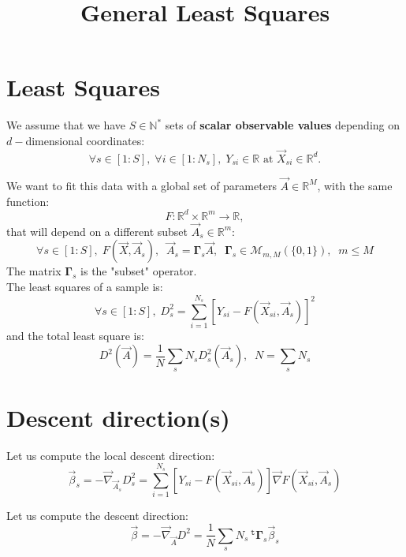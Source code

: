 \documentclass[aps,12pt]{revtex4}
\newcommand{\trn}[1]{~^{\mathtt{t}}{#1}}
\begin{document}
\title{General Least Squares}
\maketitle

\section{Least Squares}
We assume that we have $S\in \mathbb{N}^*$ sets of \textbf{scalar observable values} depending on $d-$dimensional coordinates:
\begin{equation}
	\forall s \in [1:S], \; \forall i \in [1:N_s], \; Y_{si} \in \mathbb{R} \text{ at } \vec{X}_{si} \in \mathbb{R}^d.
\end{equation}

We want to fit this data with a global set of parameters $\vec{A}\in \mathbb{R}^M$,
with the same function: 
\begin{equation}
F : \mathbb{R}^d \times \mathbb{R}^m \rightarrow \mathbb{R},
\end{equation}
that will depend on a different subset $\vec{A}_s\in\mathbb{R}^m$:
\begin{equation}
	\forall s \in [1:S], \; F(\vec{X},\vec{A}_s), \;\; \vec{A}_s = \bm{\Gamma}_s \vec{A}, \;\; \bm{\Gamma}_s \in \mathcal{M}_{m,M}(\{0,1\}),\;\;m\leq M
\end{equation}
The matrix $\bm{\Gamma}_s$ is the "subset" operator.\\
The least squares of a sample is:
\begin{equation}
		\forall s \in [1:S], \; D^2_s = \sum_{i=1}^{N_s} \left[ Y_{si} - F(\vec{X}_{si},\vec{A}_s) \right]^2
\end{equation}
and the total least square is:
\begin{equation}
	D^2(\vec{A}) = \frac{1}{N}\sum_s N_s D^2_s (\vec{A}_s ),\;\; N=\sum_s N_s
\end{equation}

\section{Descent direction(s)}
Let us compute the local descent direction:
\begin{equation}
	\vec{\beta}_s = - \vec{\nabla}_{\vec{A}_s} D^2_s =  \sum_{i=1}^{N_s} \left[ Y_{si} - F(\vec{X}_{si},\vec{A}_s) \right] \vec{\nabla} F(\vec{X}_{si},\vec{A}_s)
\end{equation}

Let us compute the descent direction:
\begin{equation}
 	\vec{\beta}    = - \vec{\nabla}_{\vec{A}} D^2 
	 =  \dfrac{1}{N} \sum_s N_s \trn{\bm{\Gamma}}_s \vec{\beta}_s
\end{equation}
\end{document}
